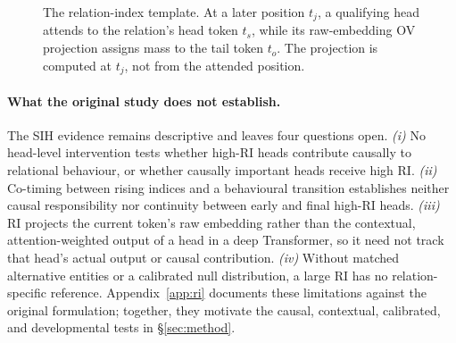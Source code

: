 \begin{figure}[t]
\centering
{}
\caption{The relation-index template. At a later position $t_j$, a qualifying
head attends to the relation's head token $t_s$, while its raw-embedding OV
projection assigns mass to the tail token $t_o$. The projection is computed at
$t_j$, not from the attended position.}
\label{fig:ri}
\end{figure}

\paragraph{What the original study does not establish.}
The SIH evidence remains descriptive and leaves four questions open.
\emph{(i)} No head-level intervention tests whether high-RI heads contribute
causally to relational behaviour, or whether causally important heads receive
high RI. \emph{(ii)} Co-timing between rising indices and a behavioural
transition establishes neither causal responsibility nor continuity between
early and final high-RI heads. \emph{(iii)} RI projects the current token's raw
embedding rather than the contextual, attention-weighted output of a head in a
deep Transformer, so it need not track that head's actual output or causal
contribution. \emph{(iv)} Without matched alternative entities or a calibrated
null distribution, a large RI has no relation-specific reference.
Appendix~\ref{app:ri} documents these limitations against the original
formulation; together, they motivate the causal, contextual, calibrated, and
developmental tests in \S\ref{sec:method}.
